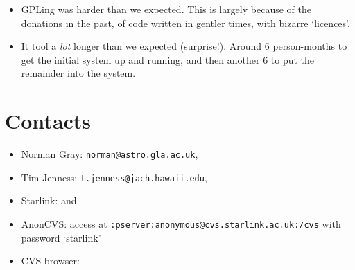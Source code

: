 \documentclass[11pt,twoside]{article}
\begin{document}
\begin{itemize}
\item GPLing was harder than we expected.  This is largely because of
  the donations in the past, of code written in gentler times, with
  bizarre `licences'.

\item It tool a \emph{lot} longer than we expected (surprise!).  Around 6
  person-months to get the initial system up and running, and then
  another 6 to put the remainder into the system.

\end{itemize}



\section{Contacts}

\begin{itemize}
\item Norman Gray: \texttt{norman@astro.gla.ac.uk},

\item Tim Jenness: \texttt{t.jenness@jach.hawaii.edu},

\item Starlink:  and

\item AnonCVS: access at
  \texttt{:pserver:anonymous@cvs.starlink.ac.uk:/cvs} 
  with password `starlink'

\item CVS browser: 
\end{itemize}
\end{document}
